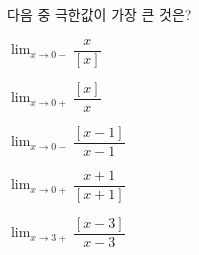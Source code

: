 다음 중 극한값이 가장 큰 것은? 
\begin{choices32}{\rule[-3ex]{0pt}{8ex}$\displaystyle\lim_{x\to 0-}\dfrac{x}{[x]}$}{\rule[-3ex]{0pt}{8ex}$\displaystyle\lim_{x\to 0+}\dfrac{[x]}{x}$}{\rule[-3ex]{0pt}{8ex}$\displaystyle\lim_{x\to 0-}\dfrac{[x-1]}{x-1}$}{\rule[-3ex]{0pt}{8ex}$\displaystyle\lim_{x\to 0+}\dfrac{x+1}{[x+1]}$}{\rule[-3ex]{0pt}{8ex}$\displaystyle\lim_{x\to 3+}\dfrac{[x-3]}{x-3}$}\end{choices32}
